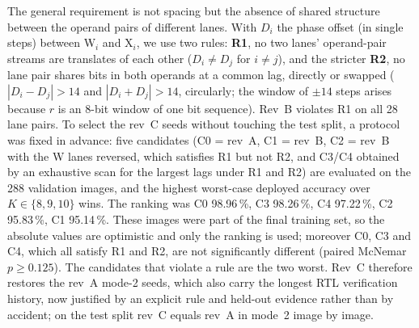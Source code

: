\documentclass[conference]{IEEEtran}
\begin{document}
The general requirement is not spacing but the absence of shared structure
between the operand pairs of different lanes. With $D_i$ the phase offset
(in single steps) between W$_i$ and X$_i$, we use two rules:
\textbf{R1}, no two lanes' operand-pair streams are translates of each other
($D_i\neq D_j$ for $i\neq j$), and the stricter \textbf{R2}, no lane pair
shares bits in both operands at a common lag, directly or swapped
($|D_i-D_j|>14$ and $|D_i+D_j|>14$, circularly; the window of $\pm14$ steps
arises because $r$ is an 8-bit window of one bit sequence). Rev~B violates R1
on all 28 lane pairs.
To select the rev~C seeds without touching the test split, a protocol was
fixed in advance: five candidates (C0 = rev~A, C1 = rev~B, C2 = rev~B with the
W lanes reversed, which satisfies R1 but not R2, and C3/C4 obtained by an
exhaustive scan for the largest lags under R1 and R2) are evaluated on the
288 validation images, and the highest worst-case deployed accuracy over
$K\in\{8,9,10\}$ wins. The ranking was C0 98.96\,\%, C3 98.26\,\%, C4
97.22\,\%, C2 95.83\,\%, C1 95.14\,\%. These images were part of the final
training set, so the absolute values are optimistic and only the ranking is
used; moreover C0, C3 and C4, which all satisfy R1 and R2, are not
significantly different (paired McNemar $p\ge0.125$). The candidates that
violate a rule are the two worst. Rev~C therefore restores the rev~A mode-2
seeds, which also carry the longest RTL verification history, now justified
by an explicit rule and held-out evidence rather than by accident; on the
test split rev~C equals rev~A in mode~2 image by image.
\end{document}
